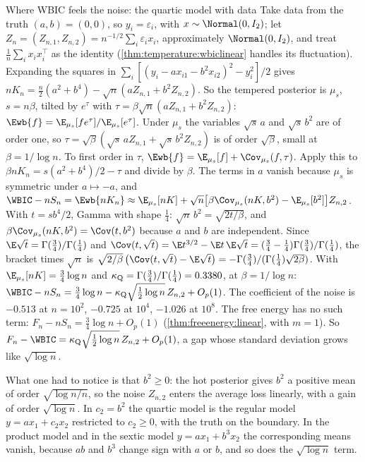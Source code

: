 \begin{refsection}
\begin{computation}{Where WBIC feels the noise: the quartic model with data}\label{comp:temperature:wbic}
\step Take data from the truth $(a,b)=(0,0)$, so $y_i=\varepsilon_i$, with $x\sim\Normal(0,I_2)$; let $Z_n=(Z_{n,1},Z_{n,2})=n^{-1/2}\sum_i\varepsilon_ix_i$, approximately $\Normal(0,I_2)$, and treat $\frac1n\sum_ix_ix_i^\top$ as the identity (\cref{thm:temperature:wbiclinear} handles its fluctuation). Expanding the squares in $\sum_i[(y_i-ax_{i1}-b^2x_{i2})^2-y_i^2]/2$ gives $nK_n=\frac n2(a^2+b^4)-\sqrt n(aZ_{n,1}+b^2Z_{n,2})$.
\step So the tempered posterior is $\mu_s$, $s=n\beta$, tilted by $e^\tau$ with $\tau=\beta\sqrt n(aZ_{n,1}+b^2Z_{n,2})$: $\Ewb{f}=\E_{\mu_s}[fe^\tau]/\E_{\mu_s}[e^\tau]$. Under $\mu_s$ the variables $\sqrt s\,a$ and $\sqrt s\,b^2$ are of order one, so $\tau=\sqrt\beta(\sqrt s\,aZ_{n,1}+\sqrt s\,b^2Z_{n,2})$ is of order $\sqrt\beta$, small at $\beta=1/\log n$. To first order in $\tau$, $\Ewb{f}=\E_{\mu_s}[f]+\Cov_{\mu_s}(f,\tau)$.
\step Apply this to $\beta nK_n=s(a^2+b^4)/2-\tau$ and divide by $\beta$. The terms in $a$ vanish because $\mu_s$ is symmetric under $a\mapsto-a$, and $\WBIC-nS_n=\Ewb{nK_n}\approx\E_{\mu_s}[nK]+\sqrt n\bigl[\beta\Cov_{\mu_s}(nK,b^2)-\E_{\mu_s}[b^2]\bigr]Z_{n,2}$.
\step With $t=sb^4/2$, Gamma with shape $\frac14$: $\sqrt n\,b^2=\sqrt{2t/\beta}$, and $\beta\Cov_{\mu_s}(nK,b^2)=\Cov(t,b^2)$ because $a$ and $b$ are independent. Since $\E\sqrt t=\Gamma(\frac34)/\Gamma(\frac14)$ and $\Cov(t,\sqrt t)=\E t^{3/2}-\E t\,\E\sqrt t=(\frac34-\frac14)\Gamma(\frac34)/\Gamma(\frac14)$, the bracket times $\sqrt n$ is $\sqrt{2/\beta}\,\bigl(\Cov(t,\sqrt t)-\E\sqrt t\bigr)=-\Gamma(\frac34)/(\Gamma(\frac14)\sqrt{2\beta})$.
\step With $\E_{\mu_s}[nK]=\frac34\log n$ and $\kappa_{\mathrm{Q}}=\Gamma(\frac34)/\Gamma(\frac14)=0.3380$, at $\beta=1/\log n$: $\WBIC-nS_n=\frac34\log n-\temperaturekQ\sqrt{\tfrac12\log n}\,Z_{n,2}+O_p(1)$. The coefficient of the noise is $-0.513$ at $n=10^2$, $-0.725$ at $10^4$, $-1.026$ at $10^8$.
\step The free energy has no such term: $F_n-nS_n=\frac34\log n+O_p(1)$ (\cref{thm:freeenergy:linear}, with $m=1$). So $F_n-\WBIC=\temperaturekQ\sqrt{\frac12\log n}\,Z_{n,2}+O_p(1)$, a gap whose standard deviation grows like $\sqrt{\log n}$.
\end{computation}

What one had to notice is that $b^2\ge0$: the hot posterior gives $b^2$ a positive mean of order $\sqrt{\log n/n}$, so the noise $Z_{n,2}$ enters the average loss linearly, with a gain of order $\sqrt{\log n}$. In $c_2=b^2$ the quartic model is the regular model $y=ax_1+c_2x_2$ restricted to $c_2\ge0$, with the truth on the boundary. In the product model and in the sextic model $y=ax_1+b^3x_2$ the corresponding means vanish, because $ab$ and $b^3$ change sign with $a$ or $b$, and so does the $\sqrt{\log n}$ term.


\end{refsection}

